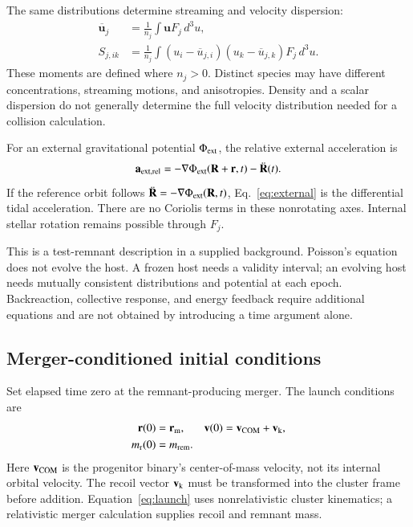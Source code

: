 \documentclass[aps,prd,reprint,amsmath,amssymb,superscriptaddress,nofootinbib,longbibliography,floatfix]{revtex4-2}
\begin{document}
The same distributions determine streaming and velocity dispersion:
\begin{align}
\overline{\mathbf u}_j
&=\frac{1}{n_j}\int\mathbf u F_j\,d^3u,
\label{eq:streaming}\\
S_{j,ik}
&=\frac{1}{n_j}\int
(u_i-\overline u_{j,i})(u_k-\overline u_{j,k})F_j\,d^3u.
\label{eq:dispersion}
\end{align}
These moments are defined where $n_j>0$. Distinct species may have different concentrations, streaming motions, and anisotropies. Density and a scalar dispersion do not generally determine the full velocity distribution needed for a collision calculation.

For an external gravitational potential $\Phi_{\rm ext}$, the relative external acceleration is
\begin{equation}
\mathbf a_{\rm ext,rel}
=-\nabla\Phi_{\rm ext}(\mathbf R+\mathbf r,t)
-\ddot{\mathbf R}(t).
\label{eq:external}
\end{equation}
If the reference orbit follows
$\ddot{\mathbf R}=-\nabla\Phi_{\rm ext}(\mathbf R,t)$,
Eq.~\eqref{eq:external} is the differential tidal acceleration. There are no Coriolis terms in these nonrotating axes. Internal stellar rotation remains possible through $F_j$.

This is a test-remnant description in a supplied background. Poisson's equation does not evolve the host. A frozen host needs a validity interval; an evolving host needs mutually consistent distributions and potential at each epoch. Backreaction, collective response, and energy feedback require additional equations and are not obtained by introducing a time argument alone.

\subsection{Merger-conditioned initial conditions}

Set elapsed time zero at the remnant-producing merger. The launch conditions are
\begin{align}
\mathbf r(0)&=\mathbf r_{\rm m},
&
\mathbf v(0)&=\mathbf v_{\rm COM}+\mathbf v_{\rm k},
\label{eq:launch}\\
m_{\rm r}(0)&=m_{\rm rem}.
\label{eq:remnant-mass}
\end{align}
Here $\mathbf v_{\rm COM}$ is the progenitor binary's center-of-mass velocity, not its internal orbital velocity. The recoil vector $\mathbf v_{\rm k}$ must be transformed into the cluster frame before addition. Equation~\eqref{eq:launch} uses nonrelativistic cluster kinematics; a relativistic merger calculation supplies recoil and remnant mass.
\end{document}

